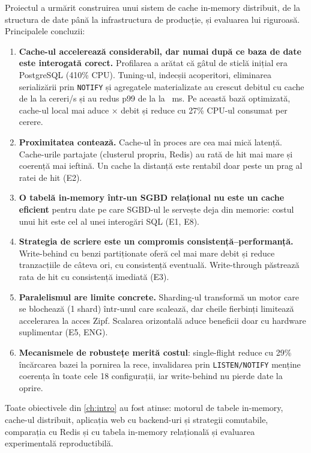 Proiectul a urmărit construirea unui sistem de cache in-memory distribuit, de la structura de date până la
infrastructura de producție, și evaluarea lui riguroasă. Principalele concluzii:

\begin{enumerate}
  \item \textbf{Cache-ul accelerează considerabil, dar numai după ce baza de date este interogată corect.}
        Profilarea a arătat că gâtul de sticlă inițial era PostgreSQL (410\% CPU). Tuning-ul, indecșii
        acoperitori, eliminarea serializării prin \texttt{NOTIFY} și agregatele materializate au crescut
        debitul cu cache de la  la  cereri/s și au redus p99 de la
         la ~ms. Pe această bază optimizată, cache-ul local mai aduce
        × debit și reduce cu 27\% CPU-ul consumat per cerere.
  \item \textbf{Proximitatea contează.} Cache-ul în proces are cea mai mică latență. Cache-urile partajate
        (clusterul propriu, Redis) au rată de hit mai mare și coerență mai ieftină. Un cache la distanță este
        rentabil doar peste un prag al ratei de hit (E2).
  \item \textbf{O tabelă in-memory într-un SGBD relațional nu este un cache eficient} pentru date pe care SGBD-ul
        le servește deja din memorie: costul unui hit este cel al unei interogări SQL (E1, E8).
  \item \textbf{Strategia de scriere este un compromis consistență–performanță.} Write-behind cu benzi
        partiționate oferă cel mai mare debit și reduce tranzacțiile de câteva ori, cu consistență eventuală.
        Write-through păstrează rata de hit cu consistență imediată (E3).
  \item \textbf{Paralelismul are limite concrete.} Sharding-ul transformă un motor care se blochează (1 shard)
        într-unul care scalează, dar cheile fierbinți limitează accelerarea la acces Zipf. Scalarea orizontală
        aduce beneficii doar cu hardware suplimentar (E5, ENG).
  \item \textbf{Mecanismele de robustețe merită costul}: single-flight reduce cu 29\% încărcarea bazei la
        pornirea la rece, invalidarea prin \texttt{LISTEN/NOTIFY} menține coerența în toate cele 18
        configurații, iar write-behind nu pierde date la oprire.
\end{enumerate}

Toate obiectivele din \cref{ch:intro} au fost atinse: motorul de tabele in-memory, cache-ul distribuit,
aplicația web cu backend-uri și strategii comutabile, comparația cu Redis și cu tabela in-memory relațională
și evaluarea experimentală reproductibilă.
